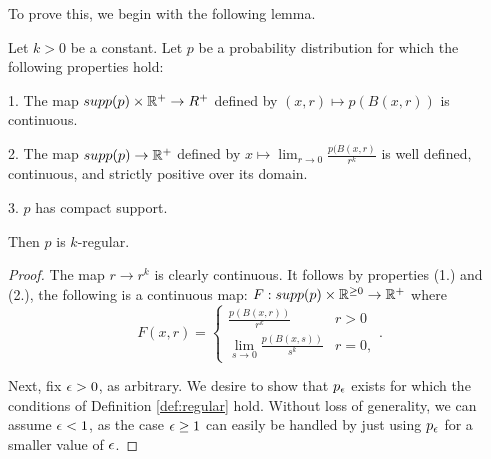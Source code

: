 To prove this, we begin with the following lemma.

\begin{lemma}\label{lem:conditions_for_alpha_regularity}
Let $k > 0$ be a constant. Let $p$ be a probability distribution for which the following properties hold:

1. The map $supp(p) \times \mathbb{R}^+ \to R^+$ defined by $(x, r) \mapsto p(B(x, r))$ is continuous.

2. The map $supp(p) \to \mathbb{R}^+$ defined by $x \mapsto \lim_{r \to 0}\frac{p(B(x, r)}{r^k}$ is  well defined, continuous, and strictly positive over its domain.

3. $p$ has compact support. 

Then $p$ is $k$-regular. 
\end{lemma}

\begin{proof}
The map $r \to r^k$ is clearly continuous. It follows by properties (1.) and (2.), the following is a continuous map: $F: supp(p) \times \mathbb{R}^{\geq 0} \to \mathbb{R}^+$ where $$F(x, r) = \begin{cases} \frac{p(B(x, r))}{r^k} & r > 0 \\\lim_{s \to 0} \frac{p(B(x, s))}{s^k} & r = 0,\end{cases}.$$

Next, fix $\epsilon > 0$, as arbitrary. We desire to show that $p_\epsilon$ exists for which the conditions of Definition \ref{def:regular} hold. Without loss of generality, we can assume $\epsilon < 1$, as the case $\epsilon \geq 1$ can easily be handled by just using $p_\epsilon$ for a smaller value of $\epsilon$. 


\end{proof}
